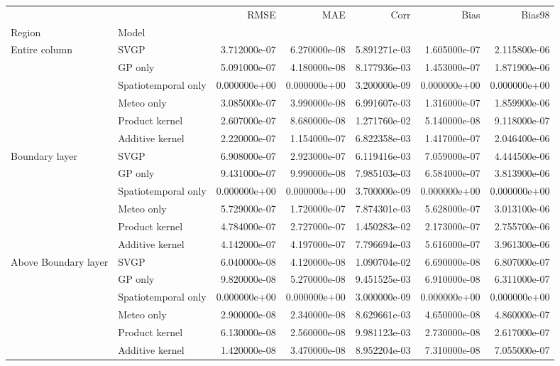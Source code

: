 \begin{tabular}{llrrrrr}
\toprule
                     &                 &         RMSE &          MAE &         Corr &         Bias &       Bias98 \\
Region & Model &              &              &              &              &              \\
\midrule
Entire column & SVGP & 3.712000e-07 & 6.270000e-08 & 5.891271e-03 & 1.605000e-07 & 2.115800e-06 \\
                     & GP only & 5.091000e-07 & 4.180000e-08 & 8.177936e-03 & 1.453000e-07 & 1.871900e-06 \\
                     & Spatiotemporal only & 0.000000e+00 & 0.000000e+00 & 3.200000e-09 & 0.000000e+00 & 0.000000e+00 \\
                     & Meteo only & 3.085000e-07 & 3.990000e-08 & 6.991607e-03 & 1.316000e-07 & 1.859900e-06 \\
                     & Product kernel & 2.607000e-07 & 8.680000e-08 & 1.271760e-02 & 5.140000e-08 & 9.118000e-07 \\
                     & Additive kernel & 2.220000e-07 & 1.154000e-07 & 6.822358e-03 & 1.417000e-07 & 2.046400e-06 \\
Boundary layer & SVGP & 6.908000e-07 & 2.923000e-07 & 6.119416e-03 & 7.059000e-07 & 4.444500e-06 \\
                     & GP only & 9.431000e-07 & 9.990000e-08 & 7.985103e-03 & 6.584000e-07 & 3.813900e-06 \\
                     & Spatiotemporal only & 0.000000e+00 & 0.000000e+00 & 3.700000e-09 & 0.000000e+00 & 0.000000e+00 \\
                     & Meteo only & 5.729000e-07 & 1.720000e-07 & 7.874301e-03 & 5.628000e-07 & 3.013100e-06 \\
                     & Product kernel & 4.784000e-07 & 2.727000e-07 & 1.450283e-02 & 2.173000e-07 & 2.755700e-06 \\
                     & Additive kernel & 4.142000e-07 & 4.197000e-07 & 7.796694e-03 & 5.616000e-07 & 3.961300e-06 \\
Above Boundary layer & SVGP & 6.040000e-08 & 4.120000e-08 & 1.090704e-02 & 6.690000e-08 & 6.807000e-07 \\
                     & GP only & 9.820000e-08 & 5.270000e-08 & 9.451525e-03 & 6.910000e-08 & 6.311000e-07 \\
                     & Spatiotemporal only & 0.000000e+00 & 0.000000e+00 & 3.000000e-09 & 0.000000e+00 & 0.000000e+00 \\
                     & Meteo only & 2.900000e-08 & 2.340000e-08 & 8.629661e-03 & 4.650000e-08 & 4.860000e-07 \\
                     & Product kernel & 6.130000e-08 & 2.560000e-08 & 9.981123e-03 & 2.730000e-08 & 2.617000e-07 \\
                     & Additive kernel & 1.420000e-08 & 3.470000e-08 & 8.952204e-03 & 7.310000e-08 & 7.055000e-07 \\
\bottomrule
\end{tabular}
